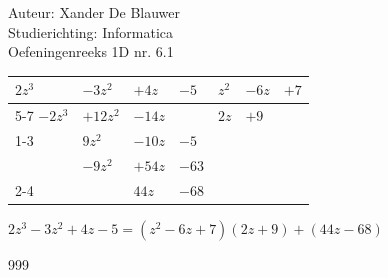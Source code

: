 \documentclass[a4paper]{article}
\begin{document}
\noindent \large Auteur: Xander De Blauwer \\
\noindent \large Studierichting: Informatica\\
\noindent \large Oefeningenreeks 1D nr. 6.1\\

\medskip

\normalsize


\begin{tabular}{llll|lll}
$2z^3$    & $-3z^2$   & $+4z$   & $-5$     & $z^2$  & $-6z$  & $+7$ \\ \cline{5-7}
$-2z^3$   & $+12z^2$  & $-14z$  &          & $2z$   & $+9$   &  \\ \cline{1-3}
          & $9z^2$    & $-10z$  & $-5$     &        &        &  \\
          & $-9z^2$   & $+54z$  & $-63$    &        &        &  \\ \cline{2-4}
          &           & $44z$   & $-68$    &        &        &  \\
\end{tabular} 

$2z^3-3z^2+4z-5=(z^2-6z+7)(2z+9)+(44z-68)$ \\




\begin{thebibliography}{999}
\end{thebibliography}
\end{document}
